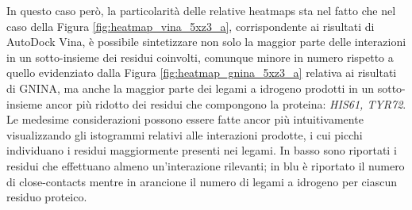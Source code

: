 In questo caso però, la particolarità delle relative heatmaps sta nel fatto che nel caso della Figura \ref{fig:heatmap_vina_5xz3_a}, corrispondente ai risultati di AutoDock Vina, è possibile sintetizzare non solo la maggior parte delle interazioni in un sotto-insieme dei residui coinvolti, comunque minore in numero rispetto a quello evidenziato dalla Figura \ref{fig:heatmap_gnina_5xz3_a} relativa ai risultati di GNINA, ma anche la maggior parte dei legami a idrogeno prodotti in un sotto-insieme ancor più ridotto dei residui che compongono la proteina: \textit{HIS61, TYR72}.\newline
Le medesime considerazioni possono essere fatte ancor più intuitivamente visualizzando gli istogrammi relativi alle interazioni prodotte, i cui picchi individuano i residui maggiormente presenti nei legami. In basso sono riportati i residui che effettuano almeno un'interazione rilevanti; in blu è riportato il numero di close-contacts mentre in arancione il numero di legami a idrogeno per ciascun residuo proteico.

